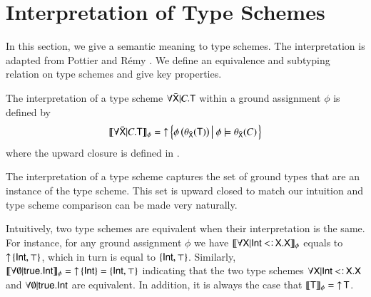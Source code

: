 \documentclass{report}
\begin{document}
  \section{Interpretation of Type Schemes}
  In this section, we give a semantic meaning to type schemes. The interpretation 
  is adapted from Pottier and R\'emy \cite{pottier-remy-emlti}.
  We define an equivalence and subtyping relation on type schemes
  and give key properties.
  \begin{dfn}
    The interpretation of a type scheme $\forall\bar{\textsf{X}}|C.\textsf{T}$
    within a ground assignment $\phi$ is defined by
    \begin{displaymath}
      \llbracket{\forall\bar{\textsf{X}}|C.\textsf{T}}\rrbracket_{\phi} =
        \mathop{\rm\uparrow}\nolimits\left\{{\phi\left({\theta_{\bar{\textsf{X}}}(\textsf{T})}\right)}\left|\ {\phi\models\theta_{\bar{\textsf{X}}}(C)}\right.\right\}
    \end{displaymath}
    where the upward closure is defined in .
  \end{dfn}
  The interpretation of a type scheme captures the set of ground types that are an instance of the
  type scheme. This set is upward closed to match our intuition and type scheme
  comparison can be made very naturally.
  
  Intuitively, two type schemes are equivalent when their interpretation is the same.
  For instance, for any ground assignment $\phi$ we have
  $\sinterp{\forall\type{X}|\Int\subtype\type{X}.\type{X}}$ equals to $\mathop{\rm\uparrow}\nolimits\left\{\textsf{Int},\top\right\}$,
  which in turn is equal to $\left\{\textsf{Int},\top\right\}$. Similarly,
  $\llbracket{\forall\emptyset|\textsf{true}.\textsf{Int}}\rrbracket_{\phi}=\mathop{\rm\uparrow}\nolimits\left\{\textsf{Int}\right\}=\left\{\textsf{Int},\top\right\}$ indicating
  that the two type schemes $\forall\type{X}|\Int\subtype\type{X}.\type{X}$ and
  $\forall\emptyset|\textsf{true}.\textsf{Int}$ are equivalent.
  In addition, it is always the case that $\llbracket{\textsf{T}}\rrbracket_{\phi}=\mathop{\rm\uparrow}\nolimits\textsf{T}$.
  
\end{document}
